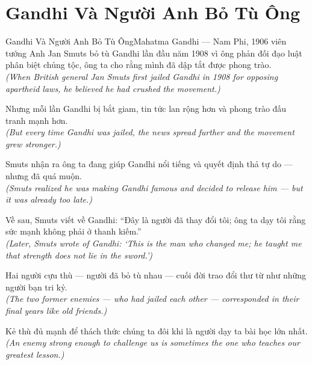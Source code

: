 \section{Gandhi Và Người Anh Bỏ Tù Ông}
\begin{truyen}{Gandhi Và Người Anh Bỏ Tù Ông}{Mahatma Gandhi --- Nam Phi, 1906}
 viên tướng Anh Jan Smuts bỏ tù Gandhi lần đầu năm 1908 vì ông phản đối đạo luật phân biệt chủng tộc, ông ta cho rằng mình đã dập tắt được phong trào.\\[4pt]
\textit{(When British general Jan Smuts first jailed Gandhi in 1908 for opposing apartheid laws, he believed he had crushed the movement.)}

Nhưng mỗi lần Gandhi bị bắt giam, tin tức lan rộng hơn và phong trào đấu tranh mạnh hơn.\\[4pt]
\textit{(But every time Gandhi was jailed, the news spread further and the movement grew stronger.)}

Smuts nhận ra ông ta đang giúp Gandhi nổi tiếng và quyết định thả tự do --- nhưng đã quá muộn.\\[4pt]
\textit{(Smuts realized he was making Gandhi famous and decided to release him --- but it was already too late.)}

Về sau, Smuts viết về Gandhi: ``Đây là người đã thay đổi tôi; ông ta dạy tôi rằng sức mạnh không phải ở thanh kiếm.''\\[4pt]
\textit{(Later, Smuts wrote of Gandhi: `This is the man who changed me; he taught me that strength does not lie in the sword.')}

Hai người cựu thù --- người đã bỏ tù nhau --- cuối đời trao đổi thư từ như những người bạn tri kỷ.\\[4pt]
\textit{(The two former enemies --- who had jailed each other --- corresponded in their final years like old friends.)}

\end{truyen}
\begin{baihoc}
  Kẻ thù đủ mạnh để thách thức chúng ta đôi khi là người dạy ta bài học lớn nhất.\\[4pt]
  \textit{(An enemy strong enough to challenge us is sometimes the one who teaches our greatest lesson.)}
\end{baihoc}

